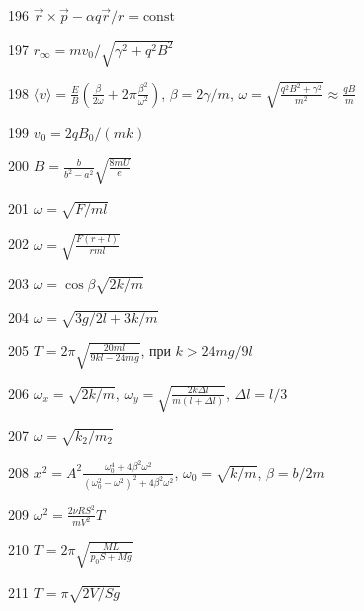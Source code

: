 \begin{Answer}{196}
$\vec r \times \vec p - \alpha q \vec r/ r = \text{const} $
\end{Answer}
\begin{Answer}{197}
$r_{\infty} = mv_0/\sqrt{\gamma^2 + q^2B^2}$
\end{Answer}
\begin{Answer}{198}
$\langle v \rangle = \frac{E}{B}\left(\frac{\beta}{2\omega} + 2\pi \frac{\beta^2}{\omega^2} \right)$, $\beta = 2\gamma/m$, $\omega = \sqrt{\frac{q^2B^2+\gamma^2}{m^2}} \approx \frac{qB}{m}$
\end{Answer}
\begin{Answer}{199}
$v_0 = 2qB_0/(mk)$
\end{Answer}
\begin{Answer}{200}
$B=\frac{b}{b^2-a^2}\sqrt{\frac{8mU}{e}}$
\end{Answer}
\begin{Answer}{201}
$\omega = \sqrt{F/ml}$
\end{Answer}
\begin{Answer}{202}
$\omega = \sqrt{\frac{F(r+l)}{rml}}$
\end{Answer}
\begin{Answer}{203}
$\omega = \cos \beta \sqrt{2k/m}$
\end{Answer}
\begin{Answer}{204}
$\omega = \sqrt{3g/2l+3k/m}$
\end{Answer}
\begin{Answer}{205}
$T=2\pi \sqrt{\frac{20ml}{9kl-24mg}}$, при $k>24mg/9l$
\end{Answer}
\begin{Answer}{206}
$\omega_x = \sqrt{2k/m}$, $\omega_y=\sqrt{\frac{2k\Delta l}{m(l+\Delta l)}}$, $\Delta l = l/3$
\end{Answer}
\begin{Answer}{207}
$\omega = \sqrt{k_2/m_2}$
\end{Answer}
\begin{Answer}{208}
$x^2 = A^2\frac{\omega_0^4+4\beta^2\omega^2}{(\omega_0^2-\omega^2)^2+4\beta^2\omega^2}$, $\omega_0 = \sqrt{k/m}$, $\beta = b/2m$
\end{Answer}
\begin{Answer}{209}
$\omega^2=\frac{2\nu R S^2}{mV^2}T$
\end{Answer}
\begin{Answer}{210}
$T=2\pi\sqrt{\frac{ML}{p_0S + Mg}}$
\end{Answer}
\begin{Answer}{211}
$T=\pi \sqrt{2V/Sg}$
\end{Answer}
